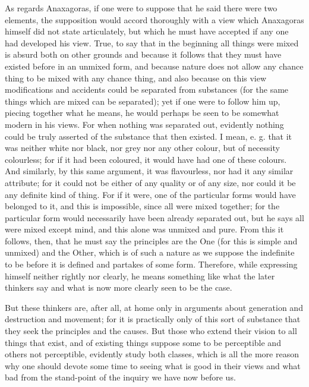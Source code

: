 As regards Anaxagoras, if one were to suppose that he said there were two elements, the supposition would accord thoroughly with a view which Anaxagoras himself did not state articulately, but which he must have accepted if any one had developed his view. True, to say that in the beginning all things were mixed is absurd both on other grounds and because it follows that they must have existed before in an unmixed form, and because nature does not allow any chance thing to be mixed with any chance thing, and also because on this view modifications and accidents could be separated from substances (for the same things which are mixed can be separated); yet if one were to follow him up, piecing together what he means, he would perhaps be seen to be somewhat modern in his views. For when nothing was separated out, evidently nothing could be truly asserted of the substance that then existed. I mean, e. g. that it was neither white nor black, nor grey nor any other colour, but of necessity colourless; for if it had been coloured, it would have had one of these colours. And similarly, by this same argument, it was flavourless, nor had it any similar attribute; for it could not be either of any quality or of any size, nor could it be any definite kind of thing. For if it were, one of the particular forms would have belonged to it, and this is impossible, since all were mixed together; for the particular form would necessarily have been already separated out, but he says all were mixed except mind, and this alone was unmixed and pure. From this it follows, then, that he must say the principles are the One (for this is simple and unmixed) and the Other, which is of such a nature as we suppose the indefinite to be before it is defined and partakes of some form. Therefore, while expressing himself neither rightly nor clearly, he means something like what the later thinkers say and what is now more clearly seen to be the case.

But these thinkers are, after all, at home only in arguments about generation and destruction and movement; for it is practically only of this sort of substance that they seek the principles and the causes. But those who extend their vision to all things that exist, and of existing things suppose some to be perceptible and others not perceptible, evidently study both classes, which is all the more reason why one should devote some time to seeing what is good in their views and what bad from the stand-point of the inquiry we have now before us.

